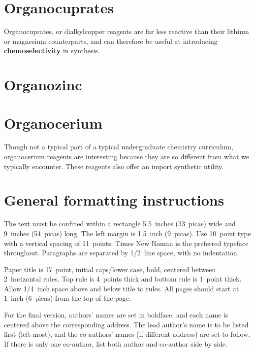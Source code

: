 \documentclass{article} %
\theoremstyle{definition}
\begin{document}
\section{Organocuprates}

Organocuprates, or dialkylcopper reagents are far less reactive than their lithium or
magnesium counterparts, and can therefore be useful at introducing \textbf{chemoselectivity} in synthesis.

\section{Organozinc}

\section{Organocerium}

Though not a typical part of a typical undergraduate chemistry curriculum, organocerium 
reagents are interesting because they are so different from what we typically encounter.
These reagents also offer an import synthetic utility.





\section{General formatting instructions}
\label{gen_inst}

The text must be confined within a rectangle 5.5~inches (33~picas) wide and
9~inches (54~picas) long. The left margin is 1.5~inch (9~picas).
Use 10~point type with a vertical spacing of 11~points. Times New Roman is the
preferred typeface throughout. Paragraphs are separated by 1/2~line space,
with no indentation.

Paper title is 17~point, initial caps/lower case, bold, centered between
2~horizontal rules. Top rule is 4~points thick and bottom rule is 1~point
thick. Allow 1/4~inch space above and below title to rules. All pages should
start at 1~inch (6~picas) from the top of the page.


For the final version, authors' names are
set in boldface, and each name is centered above the corresponding
address. The lead author's name is to be listed first (left-most), and
the co-authors' names (if different address) are set to follow. If
there is only one co-author, list both author and co-author side by side.
\end{document}
